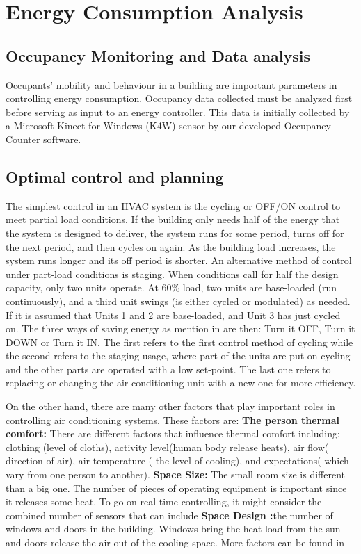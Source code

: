 \section{Energy Consumption Analysis}
\label{sec:control}

\subsection{Occupancy Monitoring and Data analysis}

Occupants' mobility and behaviour in a building are important parameters in controlling energy consumption.  Occupancy data collected  must be analyzed first before serving as input to an energy controller. This data is initially collected by a Microsoft Kinect for Windows (K4W) sensor by our developed Occupancy-Counter software.


\subsection{Optimal control and planning}
The simplest control in an HVAC system is the cycling or OFF/ON control to meet partial load conditions. If the building only needs half of the energy that the system is designed to deliver, the system runs for some period, turns off for the next period, and then cycles on again. As the building load increases, the system runs longer and its off period is shorter. An alternative method of control under part-load conditions is staging. When conditions call for half the design capacity, only two units operate. At 60\% load, two units are base-loaded (run continuously), and a third unit swings (is either cycled or modulated) as needed. If it is assumed that Units 1 and 2 are base-loaded, and Unit 3 has just cycled on. The three ways of saving energy as mention in \cite{fnd} are then: Turn it OFF, Turn it DOWN or Turn it IN. The first refers to the first control method of cycling while the second refers to the staging usage, where part of the units are put on cycling and the other parts are operated with a low set-point. The last one refers to replacing or changing the air conditioning unit with a new one for more efficiency.

On the other hand, there are many other factors that play important roles in controlling air conditioning systems. These factors are:
\textbf{ The person thermal comfort:} There are different factors that influence thermal comfort including: clothing (level of cloths), activity level(human body release heats), air flow( direction of air), air temperature ( the level of cooling), and expectations( which vary from one person to another).
\textbf{ Space Size:} The small room size is different than a big one. The number of pieces of operating equipment is important since it releases some heat. To go on real-time controlling, it might consider the combined number of sensors that can include
\textbf{Space Design :}the number of windows and doors in the building. Windows bring the heat load from the sun and doors release the air out of the cooling space. More factors can be found in \cite{fnd}


